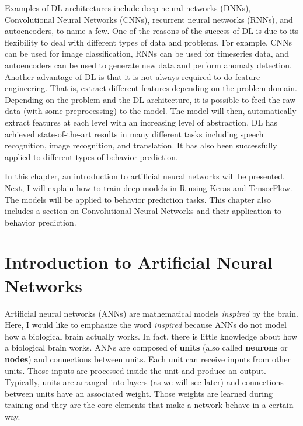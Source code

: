 \documentclass[
  11pt,
]{krantz}
\begin{document}
Examples of DL architectures include deep neural networks (DNNs), Convolutional Neural Networks (CNNs), recurrent neural networks (RNNs), and autoencoders, to name a few. One of the reasons of the success of DL is due to its flexibility to deal with different types of data and problems. For example, CNNs can be used for image classification, RNNs can be used for timeseries data, and autoencoders can be used to generate new data and perform anomaly detection. Another advantage of DL is that it is not always required to do feature engineering. That is, extract different features depending on the problem domain. Depending on the problem and the DL architecture, it is possible to feed the raw data (with some preprocessing) to the model. The model will then, automatically extract features at each level with an increasing level of abstraction. DL has achieved state-of-the-art results in many different tasks including speech recognition, image recognition, and translation. It has also been successfully applied to different types of behavior prediction.

In this chapter, an introduction to artificial neural networks will be presented. Next, I will explain how to train deep models in R using Keras and TensorFlow. The models will be applied to behavior prediction tasks. This chapter also includes a section on Convolutional Neural Networks and their application to behavior prediction.

\hypertarget{ann}{%
\section{Introduction to Artificial Neural Networks}\label{ann}}

Artificial neural networks (ANNs) are mathematical models \emph{inspired} by the brain. Here, I would like to emphasize the word \emph{inspired} because ANNs do not model how a biological brain actually works. In fact, there is little knowledge about how a biological brain works. ANNs are composed of \textbf{units} (also called \textbf{neurons} or \textbf{nodes}) and connections between units. Each unit can receive inputs from other units. Those inputs are processed inside the unit and produce an output. Typically, units are arranged into layers (as we will see later) and connections between units have an associated weight. Those weights are learned during training and they are the core elements that make a network behave in a certain way.
\end{document}
